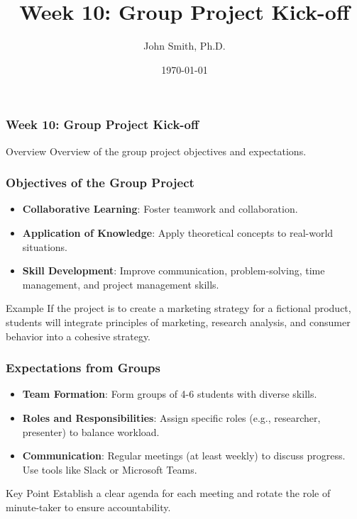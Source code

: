 \documentclass[aspectratio=169]{beamer}
\title[Week 10: Group Project Kick-off]{Week 10: Group Project Kick-off}
\author[J. Smith]{John Smith, Ph.D.}
\institute[University Name]{
  Department of Computer Science\\
  University Name\\
  \vspace{0.3cm}
  Email: email@university.edu\\
  Website: www.university.edu
}
\date{\today}
\begin{document}
\frame{\titlepage}

\begin{frame}[fragile]
    \frametitle{Week 10: Group Project Kick-off}
    \begin{block}{Overview}
        Overview of the group project objectives and expectations.
    \end{block}
\end{frame}

\begin{frame}[fragile]
    \frametitle{Objectives of the Group Project}
    \begin{itemize}
        \item \textbf{Collaborative Learning}: Foster teamwork and collaboration.
        \item \textbf{Application of Knowledge}: Apply theoretical concepts to real-world situations.
        \item \textbf{Skill Development}: Improve communication, problem-solving, time management, and project management skills.
    \end{itemize}
    \begin{block}{Example}
        If the project is to create a marketing strategy for a fictional product, students will integrate principles of marketing, research analysis, and consumer behavior into a cohesive strategy.
    \end{block}
\end{frame}

\begin{frame}[fragile]
    \frametitle{Expectations from Groups}
    \begin{itemize}
        \item \textbf{Team Formation}: Form groups of 4-6 students with diverse skills.
        \item \textbf{Roles and Responsibilities}: Assign specific roles (e.g., researcher, presenter) to balance workload.
        \item \textbf{Communication}: Regular meetings (at least weekly) to discuss progress. Use tools like Slack or Microsoft Teams.
    \end{itemize}
    \begin{block}{Key Point}
        Establish a clear agenda for each meeting and rotate the role of minute-taker to ensure accountability.
    \end{block}
\end{frame}
\end{document}
